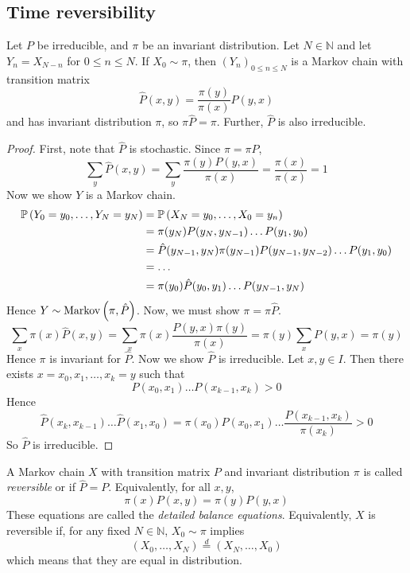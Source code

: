\subsection{Time reversibility}
\begin{theorem}
	Let \( P \) be irreducible, and \( \pi \) be an invariant distribution.
	Let \( N \in \mathbb N \) and let \( Y_n = X_{N-n} \) for \( 0 \leq n \leq N \).
	If \( X_0 \sim \pi \), then \( (Y_n)_{0 \leq n \leq N} \) is a Markov chain with transition matrix
	\[
		\hat P(x,y) = \frac{\pi(y)}{\pi(x)} P(y,x)
	\]
	and has invariant distribution \( \pi \), so \( \pi \hat P = \pi \).
	Further, \( \hat P \) is also irreducible.
\end{theorem}
\begin{proof}
	First, note that \( \hat P \) is stochastic.
	Since \( \pi = \pi P \),
	\[
		\sum_y \hat P(x,y) = \sum_y \frac{\pi(y) P(y,x)}{\pi(x)} = \frac{\pi(x)}{\pi(x)} = 1
	\]
	Now we show \( Y \) is a Markov chain.
	\begin{align*}
		\mathbb{P}\left({Y_0 = y_0, \dots, Y_N = y_N}\right) & = \mathbb{P}\left({X_N = y_0, \dots, X_0 = y_n}\right)                                      \\
		                                   & = \pi(y_N) P(y_N, y_{N-1}) \dots P(y_1, y_0)                              \\
		                                   & = \hat P(y_{N-1}, y_N) \pi(y_{N-1}) P(y_{N-1}, y_{N-2}) \dots P(y_1, y_0) \\
		                                   & = \dots                                                                   \\
		                                   & = \pi(y_0) \hat P(y_0, y_1) \dots P(y_{N-1}, y_N)
	\end{align*}
	Hence \( Y \sim \operatorname{Markov}\left({\pi, \hat P}\right) \).
	Now, we must show \( \pi = \pi \hat P \).
	\[
		\sum_x \pi(x) \hat P(x,y) = \sum_x \pi(x) \frac{P(y,x) \pi(y)}{\pi(x)} = \pi(y) \sum_x P(y,x) = \pi(y)
	\]
	Hence \( \pi \) is invariant for \( \hat P \).
	Now we show \( \hat P \) is irreducible.
	Let \( x,y \in I \).
	Then there exists \( x = x_0, x_1, \dots, x_k = y \) such that
	\[
		P(x_0, x_1) \dots P(x_{k-1}, x_k) > 0
	\]
	Hence
	\[
		\hat P(x_k, x_{k-1}) \dots \hat P(x_1, x_0) = \pi(x_0) P(x_0, x_1) \dots \frac{P(x_{k-1}, x_k)}{\pi(x_k)} > 0
	\]
	So \( \hat P \) is irreducible.
\end{proof}
\begin{definition}
	A Markov chain \( X \) with transition matrix \( P \) and invariant distribution \( \pi \) is called \textit{reversible} or  if \( \hat P = P \).
	Equivalently, for all \( x, y \),
	\[
		\pi(x) P(x,y) = \pi(y) P(y,x)
	\]
	These equations are called the \textit{detailed balance equations}.
	Equivalently, \( X \) is reversible if, for any fixed \( N \in \mathbb N \), \( X_0 \sim \pi \) implies
	\[
		(X_0, \dots, X_N) \overset{d}{=} (X_N, \dots, X_0)
	\]
	which means that they are equal in distribution.
\end{definition}
